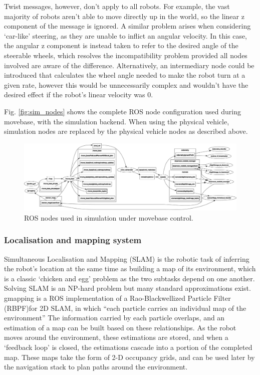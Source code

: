 \documentclass[a4paper]{article}
\begin{document}
Twist messages, however, don’t apply to all robots. For example, the vast majority of robots
aren’t able to move directly up in the world, so the linear z component of the message is
ignored. A similar problem arises when considering ‘car-like’ steering, as they are unable to
inflict an angular velocity. In this case, the angular z component is instead taken to refer to the desired angle of the steerable wheels, which resolves the incompatibility problem provided
all nodes involved are aware of the difference. Alternatively, an intermediary node could be
introduced that calculates the wheel angle needed to make the robot turn at a given rate,
however this would be unnecessarily complex and wouldn’t have the desired effect if the
robot’s linear velocity was 0.

Fig. \ref{fig:sim_nodes} shows the complete ROS node configuration used during movebase, with the simulation backend.  When using the physical vehicle, simulation nodes are replaced by the physical vehicle nodes as described above.

\begin{figure}[h]
	\includegraphics[width=\columnwidth]{figs_sim/sim_movebase_nodes.png}
	\caption{ROS nodes used in simulation under movebase control.}
	\label{fig:sim_movebase_nodes}
\end{figure}

\subsubsection{Localisation and mapping system}

Simultaneous Localisation and Mapping (SLAM) \cite{thrun2002probabilistic} is the robotic task of inferring the robot’s location at the same time as building a map of its environment, which is a classic `chicken and egg’ problem as the two subtasks depend on one another. Solving SLAM is an NP-hard problem but many standard approximations exist. gmapping \cite{yuen2017improved} is a ROS implementation of a Rao-Blackwellized Particle Filter (RBPF)for 2D SLAM, in which “each particle carries an individual map of the environment”  The information carried by each particle overlaps, and an estimation of a map can be built based on these relationships. As the robot moves around the environment, these estimations are stored, and when a ‘feedback loop’ is closed, the estimations cascade into a portion of the completed map. These maps take the form of 2-D occupancy grids, and can be used later by the navigation stack to plan paths around the environment.
\end{document}
